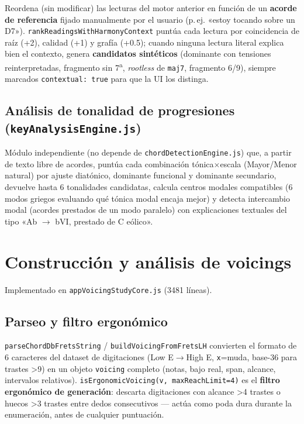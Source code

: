 \documentclass[a4paper,11pt,oneside]{report}
\begin{document}
Reordena (sin modificar) las lecturas del motor anterior en función de un \textbf{acorde de referencia} fijado manualmente por el usuario (p.\,ej. «estoy tocando sobre un D7»). \lstinline!rankReadingsWithHarmonyContext! puntúa cada lectura por coincidencia de raíz (+2), calidad (+1) y grafía (+0.5); cuando ninguna lectura literal explica bien el contexto, genera \textbf{candidatos sintéticos} (dominante con tensiones reinterpretadas, fragmento sin 7\textsuperscript{a}, \textit{rootless} de \lstinline!maj7!, fragmento 6/9), siempre marcados \lstinline!contextual: true! para que la UI los distinga.

\section{Análisis de tonalidad de progresiones (\texttt{keyAnalysisEngine.js})}
\label{sec:7.8}

Módulo independiente (no depende de \lstinline!chordDetectionEngine.js!) que, a partir de texto libre de acordes, puntúa cada combinación tónica$\times$escala (Mayor/Menor natural) por ajuste diatónico, dominante funcional y dominante secundario, devuelve hasta 6 tonalidades candidatas, calcula centros modales compatibles (6 modos griegos evaluando qué tónica modal encaja mejor) y detecta intercambio modal (acordes prestados de un modo paralelo) con explicaciones textuales del tipo «Ab $\to$ bVI, prestado de C eólico».

\chapter{Construcción y análisis de voicings}
\label{sec:8}

Implementado en \lstinline!appVoicingStudyCore.js! (3481 líneas).

\section{Parseo y filtro ergonómico}
\label{sec:8.1}

\lstinline!parseChordDbFretsString! / \lstinline!buildVoicingFromFretsLH! convierten el formato de 6 caracteres del dataset de digitaciones (Low E$\to$High E, \lstinline!x!=muda, base-36 para trastes >9) en un objeto \lstinline!voicing! completo (notas, bajo real, span, alcance, intervalos relativos). \lstinline!isErgonomicVoicing(v, maxReachLimit=4)! es el \textbf{filtro ergonómico de generación}: descarta digitaciones con alcance >4 trastes o huecos >3 trastes entre dedos consecutivos --- actúa como poda dura durante la enumeración, antes de cualquier puntuación.
\end{document}
